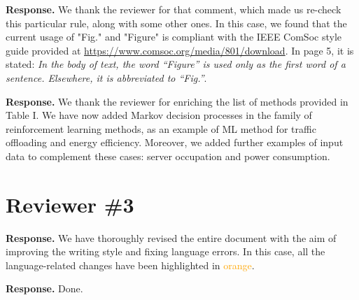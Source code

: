 \documentclass[a4paper,twoside,11pt]{reviewresponse}
\begin{document}
	
	
	\textbf{Response.} We thank the reviewer for that comment, which made us re-check this particular rule, along with some other ones. In this case, we found that the current usage of "Fig." and "Figure" is compliant with the IEEE ComSoc style guide provided at \url{https://www.comsoc.org/media/801/download}. In page 5, it is stated: \textit{In the body of text, the word “Figure” is used only as the first word of a sentence. Elsewhere, it is abbreviated to “Fig.”}.
	
	
	
	\textbf{Response.} We thank the reviewer for enriching the list of methods provided in Table I. We have now added Markov decision processes in the family of reinforcement learning methods, as an example of ML method for traffic offloading and energy efficiency. Moreover, we added further examples of input data to complement these cases: server occupation and power consumption. 
	
	
	\section{Reviewer \#3}
	
	
	\textbf{Response.} We have thoroughly revised the entire document with the aim of improving the writing style and fixing language errors. In this case, all the language-related changes have been highlighted in \textcolor{orange}{orange}. 
	
	
	\textbf{Response.} Done.
	
	
\end{document}
